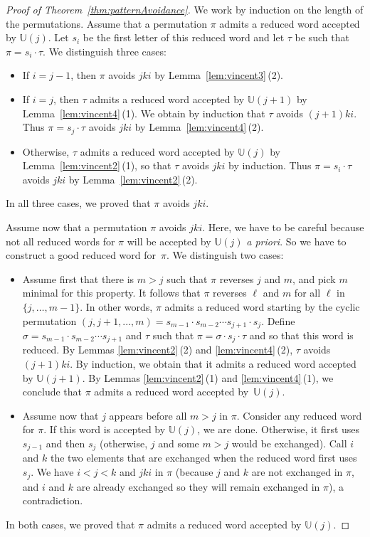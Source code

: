 \documentclass[ALCO]{cedram}
\newcommand{\apriori}{\textit{a priori}}
\newcommand{\automatonU}{\mathbb{U}}
\begin{document}
\begin{proof}[Proof of Theorem~\ref{thm:patternAvoidance}]
We work by induction on the length of the permutations.
Assume that a permutation $\pi$ admits a reduced word accepted by $\automatonU(j)$. Let $s_i$ be the first letter of this reduced word and let $\tau$ be such that $\pi = s_i \cdot \tau$. We distinguish three cases:\begin{itemize}
	\item If $i = j-1$, then $\pi$ avoids $jki$ by Lemma~\ref{lem:vincent3}\,(2).
	\item If $i = j$, then $\tau$ admits a reduced word accepted by $\automatonU(j+1)$ by Lemma~\ref{lem:vincent4}\,(1). We obtain by induction that $\tau$ avoids $(j+1)ki$. Thus $\pi = s_j \cdot \tau$ avoids $jki$ by Lemma~\ref{lem:vincent4}\,(2).
	\item Otherwise, $\tau$ admits a reduced word accepted by $\automatonU(j)$ by Lemma~\ref{lem:vincent2}\,(1), so that $\tau$ avoids $jki$ by induction. Thus $\pi = s_i \cdot \tau$ avoids $jki$ by Lemma~\ref{lem:vincent2}\,(2).
\end{itemize}
In all three cases, we proved that $\pi$ avoids $jki$.

Assume now that a permutation $\pi$ avoids $jki$. Here, we have to be careful because not all reduced words for $\pi$ will be accepted by $\automatonU(j)$ \apriori. So we have to construct a good reduced word for~$\pi$. We distinguish two cases:
\begin{itemize}
	\item Assume first that there is $m > j$ such that $\pi$ reverses $j$ and $m$, and pick $m$ minimal for this property. It follows that $\pi$ reverses $\ell$ and $m$ for all $\ell$ in $\{j,\dots,m-1\}$. In other words, $\pi$ admits a reduced word starting by the cyclic permutation $(j, j+1, ..., m) = s_{m-1} \cdot s_{m-2} \cdots s_{j+1} \cdot s_j$. Define ${\sigma = s_{m-1} \cdot s_{m-2}\cdots s_{j+1}}$ and $\tau$ such that $\pi = \sigma \cdot s_j \cdot \tau$ and so that this word is reduced. By Lemmas \ref{lem:vincent2}\,(2) and \ref{lem:vincent4}\,(2), $\tau$ avoids $(j+1)ki$. By induction, we obtain that it admits a reduced word accepted by $\automatonU(j+1)$. By Lemmas \ref{lem:vincent2}\,(1) and \ref{lem:vincent4}\,(1), we conclude that $\pi$ admits a reduced word accepted by~$\automatonU(j)$.
	\item Assume now that $j$ appears before all $m > j$ in $\pi$. Consider any reduced word for $\pi$. If this word is accepted by $\automatonU(j)$, we are done. Otherwise, it first uses $s_{j-1}$ and then $s_j$ (otherwise, $j$ and some $m > j$ would be exchanged). Call $i$ and $k$ the two elements that are exchanged when the reduced word first uses $s_j$. We have $i < j < k$ and $jki$ in $\pi$ (because $j$ and $k$ are not exchanged in $\pi$, and $i$ and $k$ are already exchanged so they will remain exchanged in $\pi$), a contradiction.
\end{itemize}
In both cases, we proved that $\pi$ admits a reduced word accepted by $\automatonU(j)$.
\end{proof}
\end{document}
